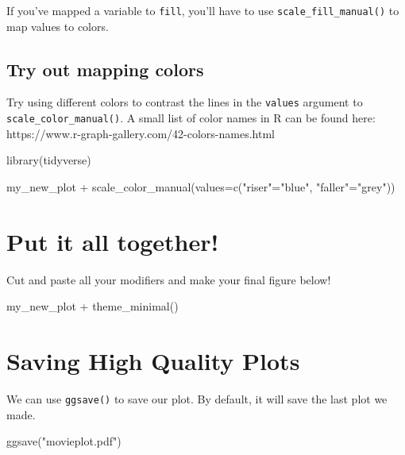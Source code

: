 \documentclass[
  letterpaper,
  DIV=11,
  numbers=noendperiod]{scrreprt}
\newenvironment{Shaded}{\begin{snugshade}}{\end{snugshade}}
\newcommand{\NormalTok}[1]{\textcolor[rgb]{0.00,0.23,0.31}{#1}}
\begin{document}
If you've mapped a variable to \texttt{fill}, you'll have to use
\texttt{scale\_fill\_manual()} to map values to colors.

\subsection*{Try out mapping colors}\label{try-out-mapping-colors}

Try using different colors to contrast the lines in the \texttt{values}
argument to \texttt{scale\_color\_manual()}. A small list of color names
in R can be found here:
https://www.r-graph-gallery.com/42-colors-names.html

\begin{Shaded}
\begin{Highlighting}[]
\NormalTok{library(tidyverse)}

\NormalTok{my\_new\_plot + }
\NormalTok{  scale\_color\_manual(values=c("riser"="blue", "faller"="grey"))}
\end{Highlighting}
\end{Shaded}

\section*{Put it all together!}\label{put-it-all-together}


Cut and paste all your modifiers and make your final figure below!

\begin{Shaded}
\begin{Highlighting}[]
\NormalTok{my\_new\_plot +}
\NormalTok{  theme\_minimal()}
\end{Highlighting}
\end{Shaded}

\section*{Saving High Quality Plots}\label{saving-high-quality-plots}


We can use \texttt{ggsave()} to save our plot. By default, it will save
the last plot we made.

\begin{Shaded}
\begin{Highlighting}[]
\NormalTok{ggsave("movieplot.pdf")}
\end{Highlighting}
\end{Shaded}
\end{document}
